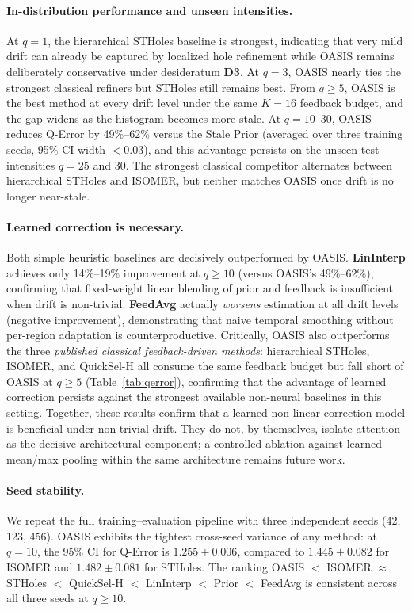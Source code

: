 \documentclass[runningheads]{llncs}
\begin{document}
\paragraph{In-distribution performance and unseen intensities.}
At $q{=}1$, the hierarchical STHoles baseline is strongest, indicating that very mild drift can already be captured by localized hole refinement while OASIS remains deliberately conservative under desideratum \textbf{D3}. At $q{=}3$, OASIS nearly ties the strongest classical refiners but STHoles still remains best. From $q{\geq}5$, OASIS is the best method at every drift level under the same $K{=}16$ feedback budget, and the gap widens as the histogram becomes more stale. At $q{=}10$--30, OASIS reduces Q-Error by 49\%--62\% versus the Stale Prior (averaged over three training seeds, 95\% CI width $<0.03$), and this advantage persists on the unseen test intensities $q{=}25$ and 30. The strongest classical competitor alternates between hierarchical STHoles and ISOMER, but neither matches OASIS once drift is no longer near-stale.

\paragraph{Learned correction is necessary.}
Both simple heuristic baselines are decisively outperformed by OASIS.
\textbf{LinInterp} achieves only 14\%--19\% improvement at $q{\geq}10$ (versus OASIS's 49\%--62\%), confirming that fixed-weight linear blending of prior and feedback is insufficient when drift is non-trivial.
\textbf{FeedAvg} actually \emph{worsens} estimation at all drift levels (negative improvement), demonstrating that naive temporal smoothing without per-region adaptation is counterproductive.
Critically, OASIS also outperforms the three \emph{published classical feedback-driven methods}: hierarchical STHoles, ISOMER, and QuickSel-H all consume the same feedback budget but fall short of OASIS at $q{\geq}5$ (Table~\ref{tab:qerror}), confirming that the advantage of learned correction persists against the strongest available non-neural baselines in this setting.
Together, these results confirm that a learned non-linear correction model is beneficial under non-trivial drift. They do not, by themselves, isolate attention as the decisive architectural component; a controlled ablation against learned mean/max pooling within the same architecture remains future work.

\paragraph{Seed stability.}
We repeat the full training--evaluation pipeline with three independent seeds (42, 123, 456).
OASIS exhibits the tightest cross-seed variance of any method: at $q{=}10$, the 95\% CI for Q-Error is $1.255 \pm 0.006$, compared to $1.445 \pm 0.082$ for ISOMER and $1.482 \pm 0.081$ for STHoles.
The ranking OASIS $<$ ISOMER $\approx$ STHoles $<$ QuickSel-H $<$ LinInterp $<$ Prior $<$ FeedAvg is consistent across all three seeds at $q{\geq}10$.
\end{document}
